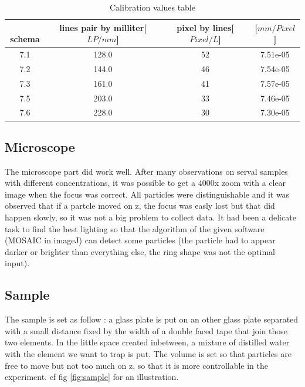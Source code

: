\documentclass[a4paper,12pt,twoside]{article}	%
\begin{document}
\begin{table}[h!]
\centering
	\begin{tabular}{|c|c|c|c|}
		\hline
﻿		schema & lines pair by milliter[$LP/mm$]& pixel by lines[$Pixel/L$] & [$mm/Pixel$]\\
		\hline
		7.1	& 128.0	& 52 & 7.51e-05\\
		7.2	& 144.0	& 46 & 7.54e-05\\
		7.3	& 161.0	& 41 & 7.57e-05\\
		7.5	& 203.0	& 33 & 7.46e-05\\
		7.6	& 228.0	& 30 & 7.30e-05\\
		\hline
	\end{tabular}
	\caption{Calibration values table}
	\label{tab:calibration}
\end{table}

\subsection{Microscope}

The microscope part did work well. After many observations on serval samples with different concentrations, it was possible to get a $4000 $x zoom with a clear image when the focus was correct. All particles were distinguishable and it was observed that if a partcle moved on z, the focus was easly lost but that did happen slowly, so it was not a big problem to collect data. It had been a delicate task to find the best lighting so that the algorithm of the given software (MOSAIC in imageJ) can detect some particles (the particle had to appear darker or brighter than everything else, the ring shape was not the optimal input).

\subsection{Sample}

The sample is set as follow : a glass plate is put on an other glass plate separated with a small distance fixed by the width of a double faced tape that join those two elements. In the little space created inbetween, a mixture of distilled water with the element we want to trap is put. The volume is set so that particles are free to move but not too much on z, so that it is more controllable in the experiment. cf fig \ref{fig:sample} for an illustration.
\end{document}
